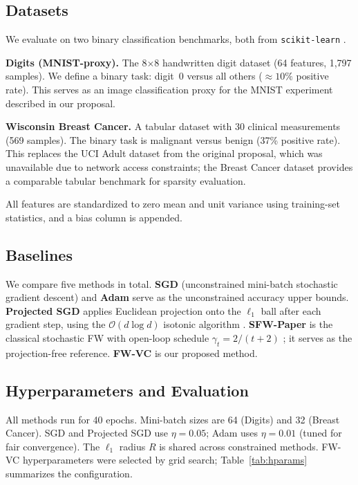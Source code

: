\documentclass[10pt,twocolumn]{article}
\begin{document}
\subsection{Datasets}

We evaluate on two binary classification benchmarks, both
from \texttt{scikit-learn} \cite{pedregosa2011}.

\textbf{Digits (MNIST-proxy).} The 8$\times$8 handwritten digit
dataset (64 features, 1,797 samples). We define a binary task: digit~0
versus all others ($\approx 10\%$ positive rate). This serves as an
image classification proxy for the MNIST experiment described in our
proposal.

\textbf{Wisconsin Breast Cancer.} A tabular dataset with 30 clinical
measurements (569 samples). The binary task is malignant versus benign
(37\% positive rate). This replaces the UCI Adult dataset from the
original proposal, which was unavailable due to network access
constraints; the Breast Cancer dataset provides a comparable tabular
benchmark for sparsity evaluation.

All features are standardized to zero mean and unit variance using
training-set statistics, and a bias column is appended.

\subsection{Baselines}

We compare five methods in total.
\textbf{SGD} (unconstrained mini-batch stochastic gradient descent)
and \textbf{Adam} \cite{kingma2015} serve as the unconstrained accuracy
upper bounds.
\textbf{Projected SGD} applies Euclidean projection onto the $\ell_1$
ball after each gradient step, using the $\mathcal{O}(d\log d)$
isotonic algorithm \cite{duchi2008}.
\textbf{SFW-Paper} is the classical stochastic FW with open-loop
schedule $\gamma_t = 2/(t+2)$ \cite{jaggi2013}; it serves as the
projection-free reference.
\textbf{FW-VC} is our proposed method.

\subsection{Hyperparameters and Evaluation}

All methods run for 40 epochs. Mini-batch sizes are 64 (Digits) and 32
(Breast Cancer). SGD and Projected SGD use $\eta = 0.05$; Adam uses
$\eta = 0.01$ (tuned for fair convergence). The $\ell_1$ radius $R$
is shared across constrained methods. FW-VC hyperparameters were
selected by grid search; Table~\ref{tab:hparams} summarizes the
configuration.
\end{document}
